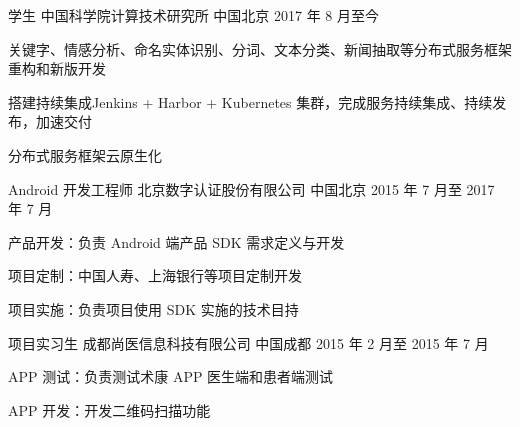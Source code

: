 

\begin{cventries}

  \cventry

    {学生} %
    {中国科学院计算技术研究所} %
    {中国北京} %
    {2017 年 8 月至今} %
    {
      \begin{cvitems} %
        \item 关键字、情感分析、命名实体识别、分词、文本分类、新闻抽取等分布式服务框架重构和新版开发
        \item 搭建持续集成Jenkins + Harbor + Kubernetes 集群，完成服务持续集成、持续发布，加速交付
        \item 分布式服务框架云原生化
      \end{cvitems}
    }

  \cventry
    {Android 开发工程师} %
    {北京数字认证股份有限公司} %
    {中国北京} %
    {2015 年 7 月至 2017 年 7 月} %
    {
      \begin{cvitems} %
        \item 产品开发：负责 Android 端产品 SDK 需求定义与开发
        \item 项目定制：中国人寿、上海银行等项目定制开发
        \item 项目实施：负责项目使用 SDK 实施的技术目持
      \end{cvitems}
    }

  \cventry
    {项目实习生} %
    {成都尚医信息科技有限公司} %
    {中国成都} %
    {2015 年 2 月至 2015 年 7 月} %
    {
      \begin{cvitems} %
        \item APP 测试：负责测试术康 APP 医生端和患者端测试
        \item APP 开发：开发二维码扫描功能
      \end{cvitems}
    }

\end{cventries}
